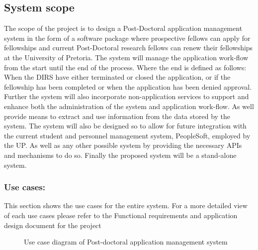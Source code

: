 \documentclass[12pt]{article}
\begin{document}
\subsection{System scope}
	
The scope of the project is to design a Post-Doctoral application management system in the form of a software package where prospective fellows can apply for fellowships and current Post-Doctoral research fellows can renew their fellowships at the University of Pretoria. The system will manage the application work-flow from the start until the end of the process. Where the end is defined as follows: When the DIRS have either terminated or closed the application, or if the fellowship has been completed or when the application has been denied approval. Further the system will also incorporate non-application services to support and enhance both the administration of the system and application work-flow. As well provide means to extract and use information from the data stored by the system. The system will also be designed so to allow for future integration with the current student and personnel management system, PeopleSoft, employed by the UP. As well as any other possible system by providing the necessary APIs and mechanisms to do so. Finally the proposed system will be a stand-alone system.
\vspace{0.2in}

\subsubsection{Use cases:}
This section shows the use cases for the entire system. For a more  detailed view of each use cases please refer to the Functional requirements and application design document for the project 
\begin{figure}[H]
\centering	
{}
\caption{Use case diagram of Post-doctoral application management system}
\end{figure}
\end{document}
